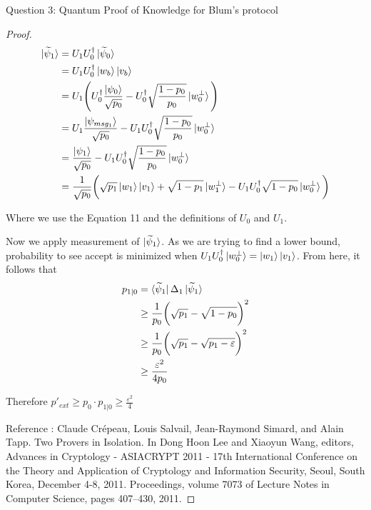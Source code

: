 \begin{solution}{Question 3: Quantum Proof of Knowledge for Blum’s protocol}
\begin{proof}
    \begin{equation*}
        \begin{split}
            \ket{\widetilde{\psi}_1} &= U_1U_0^\dag\ket{\widetilde{\psi}_0}\\
            &=U_1U_0^\dag\ket{w_b}\ket{v_b}\\
            &=U_1\Bigg(U_0^\dag\frac{\ket{\psi_0}}{\sqrt{p_0}} - U_0^\dag\sqrt{\frac{1-p_0}{p_0}}\ket{w_0^\perp} \Bigg)\\
            &=U_1\frac{\ket{\psi_{msg_1}}}{\sqrt{p_0}}-U_1U_0^\dag\sqrt{\frac{1-p_0}{p_0}}\ket{w_0^\perp}\\
            &= \frac{\ket{\psi_1}}{\sqrt{p_0}}-U_1U_0^\dag\sqrt{\frac{1-p_0}{p_0}}\ket{w_0^\perp}\\
            &= \frac{1}{\sqrt{p_0}}\bigg(\sqrt{p_1}\ket{w_1}\ket{v_1} + \sqrt{1-p_1}\ket{w_1^\perp}- U_1U_0^\dag\sqrt{1-p_0}\ket{w_0^\perp} \bigg)
        \end{split}
    \end{equation*}

    Where we use the Equation 11 and the definitions of $U_0$ and $U_1$. \newline

    Now we apply measurement of $\ket{\widetilde{\psi}_1}$. As we are trying to find a lower bound, probability to see accept is minimized when $U_1U_0^\dag\ket{w_0^\perp} = \ket{w_1}\ket{v_1}$. From here, it follows that 
    \begin{equation*}
        \begin{split}
            p_{1|0} &=  \bra{\widetilde{\psi}_1}\Delta_1\ket{\widetilde{\psi}_1}\\
            &\geq\frac{1}{p_0}\bigg(\sqrt{p_1}-\sqrt{1-p_0}\bigg)^2\\
            &\geq\frac{1}{p_0}\bigg(\sqrt{p_1}-\sqrt{p_1-\varepsilon}\bigg)^2\\
            &\geq \frac{\varepsilon^2}{4p_0}
        \end{split}
    \end{equation*}

    Therefore $p'_{ext}\geq p_0\cdot p_{1|0} \geq \frac{\varepsilon^2}{4}$\newline

Reference :  Claude Crépeau, Louis Salvail, Jean-Raymond Simard, and Alain Tapp. Two Provers in Isolation. In Dong Hoon Lee and Xiaoyun Wang, editors, Advances in Cryptology - ASIACRYPT 2011 - 17th International Conference on the Theory and Application of Cryptology and Information Security, Seoul, South Korea, December 4-8, 2011. Proceedings, volume 7073 of Lecture Notes in Computer Science, pages 407–430, 2011.

    





    
    \end{proof}
\end{solution}
